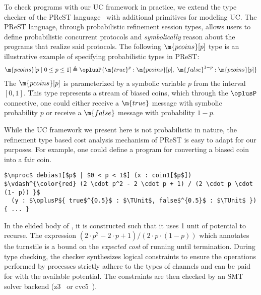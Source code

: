 To check programs with our UC framework in practice, we extend the type checker of the
PReST language~\cite{prest} with additional primitives for modeling UC. The PReST
language, through probabilistic refinement session types, allows users to define
probabilistic concurrent protocols and \emph{symbolically} reason about the programs that
realize said protocols. The following $\m{pcoins}[p]$ type is an illustrative example of 
specifying probabilistic types in PReST:
\begin{align*}
  \m{pcoins}[p \mid 0 \leq p \leq 1] \triangleq 
    \oplusP\{ \m{true}^{p} : \m{pcoins}[p]
           ,\ \m{false}^{1 - p} : \m{pcoins}[p] \}
\end{align*}
The $\m{pcoins}[p]$ is parameterized by a symbolic variable $p$ from the
interval $[0, 1]$. This type represents a stream of biased coins, which through
the $\oplusP$ connective, one could either receive a $\m{true}$ message
with symbolic probability $p$ or receive a $\m{false}$ message with
probability $1 - p$.

While the UC framework we present here is not probabilistic in nature, the 
refinement type based cost analysis mechanism of PReST is easy to adapt for our
purposes.  For example, one could define a  program for converting
a biased coin into a fair coin.
\begin{lstlisting}[basicstyle=\footnotesize\BeraMonottFamily, frame=single,  mathescape]
$\nproc$ debias1[$p$ | $0 < p < 1$] (x : coin1[$p$])
$\vdash^{\color{red} (2 \cdot p^2 - 2 \cdot p + 1) / (2 \cdot p \cdot (1- p)) }$ 
  (y : $\oplusP${ true$^{0.5}$ : $\TUnit$, false$^{0.5}$ : $\TUnit$ }) { ... }
\end{lstlisting}
In the elided body of , it is constructed such that it uses 1 unit 
of potential to recurse. The expression $(2 \cdot p^2 - 2 \cdot p + 1) / (2 \cdot p \cdot (1- p))$
which annotates the turnstile is a bound on the \emph{expected cost} of running
 until termination. During type checking, the checker 
synthesizes logical constraints to ensure the operations
performed by processes strictly adhere to the types of
channels and can be paid for with the available potential.
The constraints are then checked by an SMT solver backend
(z3~\cite{Moura08Z3} or cvc5~\cite{Barbosa22CVC5}). 


